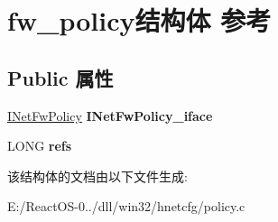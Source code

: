 \hypertarget{structfw__policy}{}\section{fw\+\_\+policy结构体 参考}
\label{structfw__policy}
\subsection*{Public 属性}
\begin{DoxyCompactItemize}
\item 
\mbox{\label{structfw__policy_ad88cf337dbb4fffa3a688f0c2b2db88d}} 
\hyperlink{interface_i_net_fw_policy}{I\+Net\+Fw\+Policy} {\bfseries I\+Net\+Fw\+Policy\+\_\+iface}
\item 
\mbox{\label{structfw__policy_a673375efa47b0a56626ac9ccc189bf67}} 
L\+O\+NG {\bfseries refs}
\end{DoxyCompactItemize}


该结构体的文档由以下文件生成\+:\begin{DoxyCompactItemize}
\item 
E\+:/\+React\+O\+S-\/0../dll/win32/hnetcfg/policy.\+c\end{DoxyCompactItemize}
